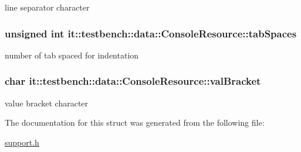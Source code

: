 line separator character \hypertarget{structit_1_1testbench_1_1data_1_1ConsoleResource_a09e1a6c33b421798b6b9518bae5b8e57}{
\subsubsection[{tab\-Spaces}]{\setlength{\rightskip}{0pt plus 5cm}unsigned int it\-::testbench\-::data\-::\-Console\-Resource\-::tab\-Spaces}}\label{de/d9c/structit_1_1testbench_1_1data_1_1ConsoleResource_a09e1a6c33b421798b6b9518bae5b8e57}
number of tab spaced for indentation \hypertarget{structit_1_1testbench_1_1data_1_1ConsoleResource_ac936cfe9139cf5e05e292a1edf913cb6}{
\subsubsection[{val\-Bracket}]{\setlength{\rightskip}{0pt plus 5cm}char it\-::testbench\-::data\-::\-Console\-Resource\-::val\-Bracket}}\label{de/d9c/structit_1_1testbench_1_1data_1_1ConsoleResource_ac936cfe9139cf5e05e292a1edf913cb6}
value bracket character 

The documentation for this struct was generated from the following file\-:\begin{DoxyCompactItemize}
\item 
\hyperlink{support_8h}{support.\-h}\end{DoxyCompactItemize}
